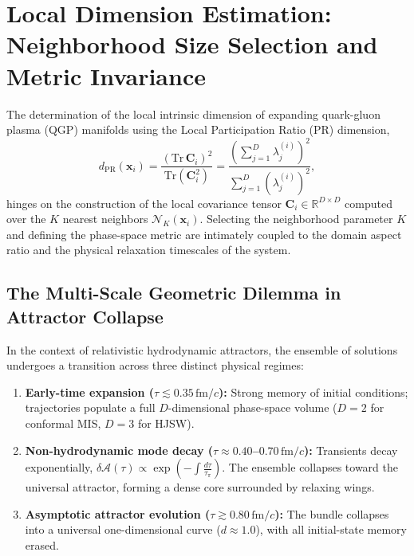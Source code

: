
\section{Local Dimension Estimation: Neighborhood Size Selection and Metric Invariance}
\label{sec:k_selection_methodology}

The determination of the local intrinsic dimension of expanding quark-gluon plasma (QGP) manifolds using the Local Participation Ratio (PR) dimension,
\begin{equation}
    d_{\mathrm{PR}}(\mathbf{x}_i) = \frac{\left(\mathrm{Tr}\,\mathbf{C}_i\right)^2}{\mathrm{Tr}\left(\mathbf{C}_i^2\right)} = \frac{\left(\sum_{j=1}^D \lambda_j^{(i)}\right)^2}{\sum_{j=1}^D \left(\lambda_j^{(i)}\right)^2},
    \label{eq:d_pr_definition}
\end{equation}
hinges on the construction of the local covariance tensor $\mathbf{C}_i \in \mathbb{R}^{D \times D}$ computed over the $K$ nearest neighbors $\mathcal{N}_K(\mathbf{x}_i)$. 
Selecting the neighborhood parameter $K$ and defining the phase-space metric are intimately coupled to the domain aspect ratio and the physical relaxation timescales of the system.

\subsection{The Multi-Scale Geometric Dilemma in Attractor Collapse}
\label{subsec:multiscale_dilemma}
In the context of relativistic hydrodynamic attractors, the ensemble of solutions undergoes a transition across three distinct physical regimes:
\begin{enumerate}
    \item \textbf{Early-time expansion ($\tau \lesssim 0.35\,\mathrm{fm}/c$):} Strong memory of initial conditions; trajectories populate a full $D$-dimensional phase-space volume ($D=2$ for conformal MIS, $D=3$ for HJSW).
    \item \textbf{Non-hydrodynamic mode decay ($\tau \approx 0.40$--$0.70\,\mathrm{fm}/c$):} Transients decay exponentially, $\delta\mathcal{A}(\tau) \propto \exp\left(-\int \frac{d\tau}{\tau_\pi}\right)$. The ensemble collapses toward the universal attractor, forming a dense core surrounded by relaxing wings.
    \item \textbf{Asymptotic attractor evolution ($\tau \gtrsim 0.80\,\mathrm{fm}/c$):} The bundle collapses into a universal one-dimensional curve ($d \approx 1.0$), with all initial-state memory erased.
\end{enumerate}

